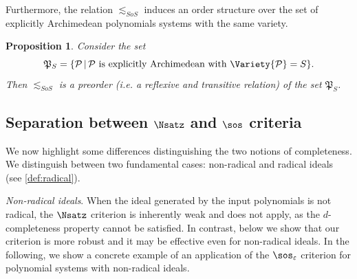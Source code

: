 \documentclass[11pt]{article}
\newtheorem{proposition}[theorem]{Proposition}
\begin{document}
Furthermore, the relation $\lesssim_{SoS}$ induces an order structure over the set of explicitly Archimedean polynomials systems with the same variety.

\begin{proposition}
    Consider the set
    \begin{equation*}
        \mathfrak{P}_{S} = \{ \mathcal{P} \, | \, \text{$\mathcal{P}$ is explicitly Archimedean with $\Variety{\mathcal{P}} = S$}\}.
    \end{equation*}
    Then $\lesssim_{SoS}$ is a \emph{preorder} (i.e. a reflexive and transitive relation) of the set $\mathfrak{P}_S$.
\end{proposition}

\subsection[Separation between Nsatz and SoS]{Separation between $\Nsatz$ and $\sos$ criteria}\label{sect:separation_Nsatz_SOS}

We now highlight some differences distinguishing the two notions of completeness. We distinguish between two fundamental cases: non-radical and radical ideals (see \cref{def:radical}).

\textit{Non-radical ideals}. When the ideal generated by the input polynomials is not radical, the $\Nsatz$ criterion is inherently weak and does not apply, as the $d$-completeness property cannot be satisfied. In contrast, below we show that our criterion is more robust and it may be effective even for non-radical ideals. 
%
In the following, we show a concrete example of an application of the $\sos_{\varepsilon}$ criterion for polynomial systems with non-radical ideals.
\end{document}
